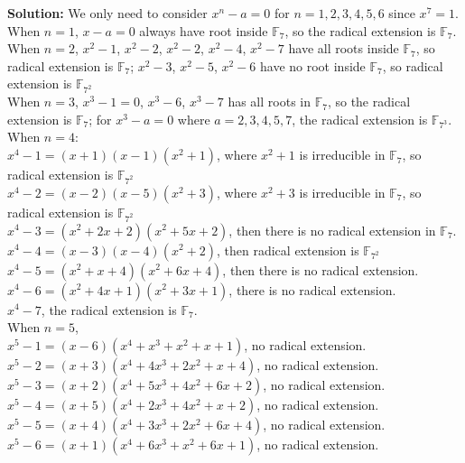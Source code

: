 \documentclass[12pt]{article}
\begin{document}
\textbf{Solution:} We only need to consider $x^n-a=0$ for $n=1, 2, 3, 4, 5, 6$ since $x^7=1$. \\
\indent When $n=1$, $x-a=0$ always have root inside $\mathbb{F}_{7}$, so the radical extension is $\mathbb{F}_{7}$. \\
\indent When $n=2$, $x^2-1$, $x^2-2$, $x^2-2$, $x^2-4$, $x^2-7$ have all roots inside $\mathbb{F}_{7}$, so radical extension is $\mathbb{F}_{7}$; $x^2-3$, $x^2-5$, $x^2-6$ have no root inside $\mathbb{F}_{7}$, so radical extension is $\mathbb{F}_{7^2}$ \\
\indent When $n=3$, $x^3-1=0$, $x^3-6$, $x^3-7$ has all roots in $\mathbb{F}_{7}$, so the radical extension is $\mathbb{F}_{7}$; for $x^3-a=0$ where $a=2, 3, 4, 5, 7$, the radical extension is $\mathbb{F}_{7^3}$. \\
\indent When $n=4$: \\
\indent\indent $x^4-1=(x+1)(x-1)(x^2+1)$, where $x^2+1$ is irreducible in $\mathbb{F}_{7}$, so radical extension is $\mathbb{F}_{7^2}$ \\
\indent\indent $x^4-2=(x-2)(x-5)(x^2+3)$, where $x^2+3$ is irreducible in $\mathbb{F}_{7}$, so radical extension is $\mathbb{F}_{7^2}$\\
\indent\indent $x^4-3=(x^2+2x+2)(x^2+5x+2)$, then there is no radical extension in $\mathbb{F}_{7}$. \\
\indent\indent $x^4-4=(x-3)(x-4)(x^2+2)$, then radical extension is $\mathbb{F}_{7^2}$ \\
\indent\indent $x^4-5=(x^2+x+4)(x^2+6x+4)$, then there is no radical extension. \\
\indent\indent $x^4-6=(x^2+4x+1)(x^2+3x+1)$, there is no radical extension. \\
\indent\indent $x^4-7$, the radical extension is $\mathbb{F}_{7}$. \\
\indent When $n=5$, \\
\indent\indent $x^5-1=(x-6)(x^4+x^3+x^2+x+1)$, no radical extension. \\
\indent\indent $x^5-2=(x+3)(x^4+4x^3+2x^2+x+4)$, no radical extension. \\
\indent\indent $x^5-3=(x+2)(x^4+5x^3+4x^2+6x+2)$, no radical extension. \\
\indent\indent $x^5-4=(x+5)(x^4+2x^3+4x^2+x+2)$, no radical extension. \\
\indent\indent $x^5-5=(x+4)(x^4+3x^3+2x^2+6x+4)$, no radical extension. \\
\indent\indent $x^5-6=(x+1)(x^4+6x^3+x^2+6x+1)$, no radical extension. \\
\end{document}
